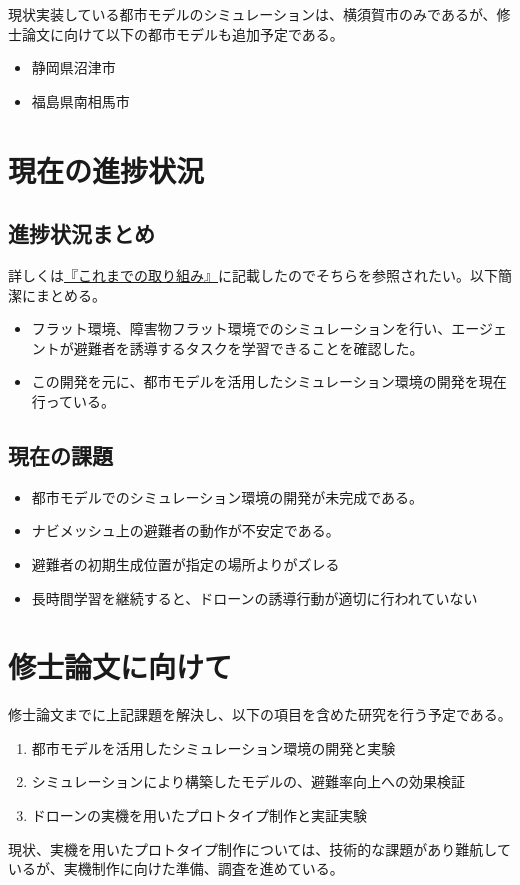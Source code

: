 \documentclass{article}[jsarticle]
\begin{document}
現状実装している都市モデルのシミュレーションは、横須賀市のみであるが、修士論文に向けて以下の都市モデルも追加予定である。
\begin{itemize}
    \item 静岡県沼津市
    \item 福島県南相馬市
\end{itemize}


\section{現在の進捗状況}
\subsection{進捗状況まとめ}
詳しくは\hyperref[sec:previous]{『これまでの取り組み』}に記載したのでそちらを参照されたい。以下簡潔にまとめる。
\begin{itemize}
    \item フラット環境、障害物フラット環境でのシミュレーションを行い、エージェントが避難者を誘導するタスクを学習できることを確認した。
    \item この開発を元に、都市モデルを活用したシミュレーション環境の開発を現在行っている。
\end{itemize}
\subsection{現在の課題}
\begin{itemize}
    \item 都市モデルでのシミュレーション環境の開発が未完成である。
    \item ナビメッシュ上の避難者の動作が不安定である。
    \item 避難者の初期生成位置が指定の場所よりがズレる
    \item 長時間学習を継続すると、ドローンの誘導行動が適切に行われていない
\end{itemize}

\section{修士論文に向けて}
修士論文までに上記課題を解決し、以下の項目を含めた研究を行う予定である。
\begin{enumerate}
    \item 都市モデルを活用したシミュレーション環境の開発と実験
    \item シミュレーションにより構築したモデルの、避難率向上への効果検証
    \item ドローンの実機を用いたプロトタイプ制作と実証実験
\end{enumerate}
現状、実機を用いたプロトタイプ制作については、技術的な課題があり難航しているが、実機制作に向けた準備、調査を進めている。
\end{document}
